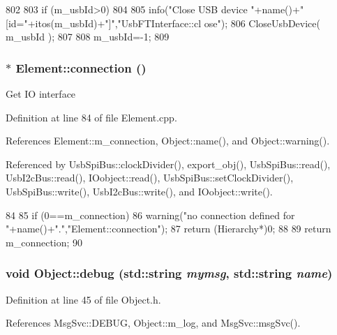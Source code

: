 \begin{DoxyCode}
802                              {
803   if (m_usbId>0)
804   {    
805     info("Close USB device "+name()+" [id="+itos(m_usbId)+"]","UsbFTInterface::cl
      ose");
806     CloseUsbDevice( m_usbId );
807   }
808   m_usbId=-1;
809 }
\end{DoxyCode}
\hypertarget{classElement_af57444353c1ddf9fa0109801e97debf7}{
\subsubsection[{connection}]{ $\ast$ Element::connection ()}}
\label{classElement_af57444353c1ddf9fa0109801e97debf7}
Get IO interface 

Definition at line 84 of file Element.cpp.

References Element::m\_\-connection, Object::name(), and Object::warning().

Referenced by UsbSpiBus::clockDivider(), export\_\-obj(), UsbSpiBus::read(), UsbI2cBus::read(), IOobject::read(), UsbSpiBus::setClockDivider(), UsbSpiBus::write(), UsbI2cBus::write(), and IOobject::write().


\begin{DoxyCode}
84                               {
85   if (0==m_connection){
86     warning("no connection defined for "+name()+".","Element::connection");
87     return (Hierarchy*)0;
88   }
89   return m_connection;
90 }
\end{DoxyCode}
\hypertarget{classObject_a6c9a0397ca804e04d675ed05683f5420}{
\subsubsection[{debug}]{\setlength{\rightskip}{0pt plus 5cm}void Object::debug (std::string {\em mymsg}, \/  std::string {\em name})}}
\label{classObject_a6c9a0397ca804e04d675ed05683f5420}


Definition at line 45 of file Object.h.

References MsgSvc::DEBUG, Object::m\_\-log, and MsgSvc::msgSvc().



